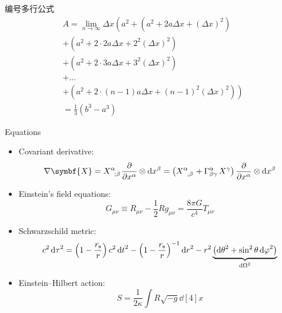 \documentclass[no-math]{ctexbeamer}
\begin{document}
\begin{frame}
	\begin{exampleblock}{编号多行公式}
		\begin{multline}
			A=\lim_{n\rightarrow\infty}\Delta x\left(a^{2}+\left(a^{2}+2a\Delta x+\left(\Delta x\right)^{2}\right)\right.\label{eq:reset}\\
			+\left(a^{2}+2\cdot2a\Delta x+2^{2}\left(\Delta x\right)^{2}\right)\\
			+\left(a^{2}+2\cdot3a\Delta x+3^{2}\left(\Delta x\right)^{2}\right)\\
			+\ldots\\
			\left.+\left(a^{2}+2\cdot(n-1)a\Delta x+(n-1)^{2}\left(\Delta x\right)^{2}\right)\right)\\
			=\frac{1}{3}\left(b^{3}-a^{3}\right)
		\end{multline}
	\end{exampleblock}
\end{frame}

\begin{frame}{Equations}
	\begin{itemize}
		\item Covariant derivative:
		\[
		\nabla \symbf{X} = \tensor{X}{^\alpha_{;\beta}} \pdv{x^\alpha} \otimes \dd{x^\beta}
						= \qty(\tensor{X}{^\alpha_{,\beta}} + \Gamma^{\alpha}_{\beta\gamma} \, X^\gamma) \,
							\pdv{x^\alpha} \otimes \dd{x^\beta}
		\]
		\item Einstein's field equations:
		\[ G_{\mu\nu} \equiv R_{\mu\nu} - \frac{1}{2} R g_{\mu\nu} = \frac{8\pi G}{c^4} T_{\mu\nu} \]
		\item Schwarzschild metric:
		\[
		c^2 \dd{\tau}^2 = \qty(1-\frac{r_{\mathrm{s}}}{r}) \, c^2 \dd{t}^2
						- \qty(1-\frac{r_{\mathrm{s}}}{r})^{-1} \dd{r}^2
						- r^2 \underbrace{\qty(\dd{\theta}^2 + \sin^2 \theta \dd{\varphi}^2)}_{\dd{\Omega}^2}
		\]
		\item Einstein--Hilbert action:
		\[ S = \frac{1}{2\kappa} \int R \sqrt{-g} \dd[4]{x} \]
	\end{itemize}
\end{frame}
\end{document}
